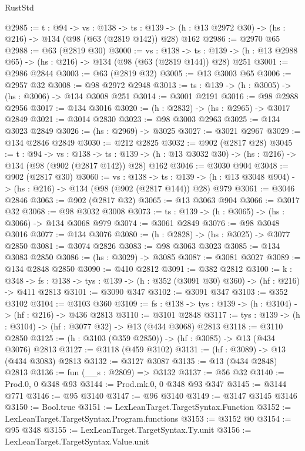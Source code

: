 \begin{lexlean}{RustStd}
\begin{coremodule}
{\begin{coremodule}
{{{{{{{{@2985 := {t : @94} ->
  {vs : @138} ->
  {ts : @139} -> (h : @13 @2972 @30) -> (hs : @216) -> @134 (@98 (@63 (@2819 @142)) @28) @162
@2986 := @2970 @65
@2988 := @63 (@2819 @30)
@3000 := {vs : @138} ->
  {ts : @139} -> (h : @13 @2988 @65) -> (hs : @216) -> @134 (@98 (@63 (@2819 @144)) @28) @251
@3001 := @2986 @2844
@3003 := @63 (@2819 @32)
@3005 := @13 @3003 @65
@3006 := @2957 @32
@3008 := @98 @2972 @2948
@3013 := {ts : @139} -> (h : @3005) -> (hs : @3006) -> @134 @3008 @251
@3014 := @3001 @2191
@3016 := @98 @2988 @2956
@3017 := @134 @3016
@3020 := (h : @2832) -> (hs : @2965) -> @3017 @2849
@3021 := @3014 @2830
@3023 := @98 @3003 @2963
@3025 := @134 @3023 @2849
@3026 := (hs : @2969) -> @3025
@3027 := @3021 @2967
@3029 := @134 @2846 @2849
@3030 := @212 @2825
@3032 := @902 (@2817 @28)
@3045 := {t : @94} ->
  {vs : @138} ->
  {ts : @139} -> (h : @13 @3032 @30) -> (hs : @216) -> @134 (@98 (@902 (@2817 @142)) @28) @162
@3046 := @3030 @904
@3048 := @902 (@2817 @30)
@3060 := {vs : @138} ->
  {ts : @139} -> (h : @13 @3048 @904) -> (hs : @216) -> @134 (@98 (@902 (@2817 @144)) @28) @979
@3061 := @3046 @2846
@3063 := @902 (@2817 @32)
@3065 := @13 @3063 @904
@3066 := @3017 @32
@3068 := @98 @3032 @3008
@3073 := {ts : @139} -> (h : @3065) -> (hs : @3066) -> @134 @3068 @979
@3074 := @3061 @2849
@3076 := @98 @3048 @3016
@3077 := @134 @3076
@3080 := (h : @2828) -> (hs : @3025) -> @3077 @2850
@3081 := @3074 @2826
@3083 := @98 @3063 @3023
@3085 := @134 @3083 @2850
@3086 := (hs : @3029) -> @3085
@3087 := @3081 @3027
@3089 := @134 @2848 @2850
@3090 := @410 @2812
@3091 := @382 @2812
@3100 := {k : @348} ->
  {fs : @138} -> {tys : @139} -> (h : @352 (@3091 @30) @360) -> (hf : @216) -> @411 @2813
@3101 := @3090 @347
@3102 := @3091 @347
@3103 := @352 @3102
@3104 := @3103 @360
@3109 := {fs : @138} -> {tys : @139} -> (h : @3104) -> (hf : @216) -> @436 @2813
@3110 := @3101 @2848
@3117 := {tys : @139} -> (h : @3104) -> (hf : @3077 @32) -> @13 (@434 @3068) @2813
@3118 := @3110 @2850
@3125 := (h : @3103 (@359 @2850)) -> (hf : @3085) -> @13 (@434 @3076) @2813
@3127 := @3118 (@459 @3102)
@3131 := (hf : @3089) -> @13 (@434 @3083) @2813
@3132 := @3127 @3087
@3135 := @13 (@434 @2848) @2813
@3136 := fun (__s : @2809) => @3132
@3137 := @56 @32
@3140 := Prod.{0, 0} @348 @93
@3144 := Prod.mk.{0, 0} @348 @93 @347
@3145 := @3144 @771
@3146 := @95 @3140
@3147 := @96 @3140
@3149 := @3147 @3145 @3146
@3150 := Bool.true
@3151 := LexLeanTarget.TargetSyntax.Function
@3152 := LexLeanTarget.TargetSyntax.Program.functions
@3153 := @3152 @0
@3154 := @95 @348
@3155 := LexLeanTarget.TargetSyntax.Ty.unit
@3156 := LexLeanTarget.TargetSyntax.Value.unit
}}}}}}}}
\end{coremodule}}
\end{coremodule}
\end{lexlean}
